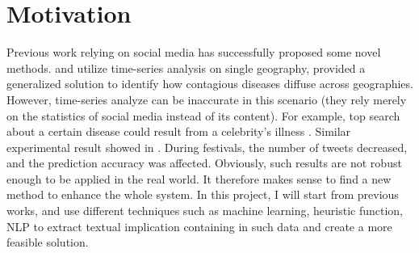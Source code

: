 \section{Motivation}
Previous work relying on social media has successfully proposed some novel methods. \cite{sadilek2012predicting} and \cite{salathe2011assessing} utilize time-series analysis on single geography, \cite{elkin2017network} provided a generalized solution to identify how contagious diseases diffuse across geographies. However, time-series analyze can be inaccurate in this scenario (they rely merely on the statistics of social media instead of its content). For example, top search about a certain disease could result from a celebrity’s illness \cite{schmidt2012trending}. Similar experimental result showed in \cite{elkin2017network}. During festivals, the number of tweets decreased, and the prediction accuracy was affected. Obviously, such results are not robust enough to be applied in the real world. It therefore makes sense to find a new method to enhance the whole system. In this project, I will start from previous works, and use different techniques such as machine learning, heuristic function, NLP to extract textual implication containing in such data and create a more feasible solution.
